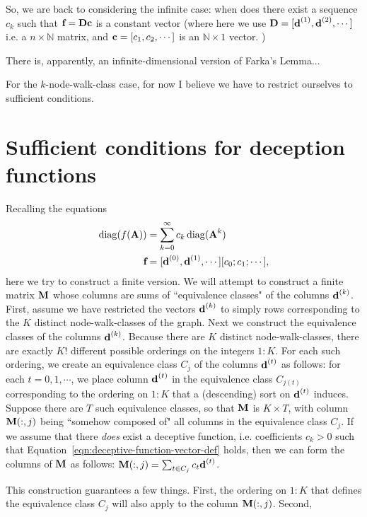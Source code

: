 So, we are back to considering the infinite case: when does there exist a sequence $c_k$ such that $\textbf{f} = \textbf{D} \textbf{c}$ is a constant vector (where here we use $\textbf{D} = [ \textbf{d}^{(1)}, \textbf{d}^{(2)}, \cdots ]$ i.e. a $n\times \mathbb{N}$ matrix, and $\textbf{c} = [ c_1, c_2, \cdots ]$ is an $\mathbb{N}\times 1$ vector. )

There is, apparently, an infinite-dimensional version of Farka's Lemma...


For the $k$-node-walk-class case, for now I believe we have to restrict ourselves to sufficient conditions.


\section{Sufficient conditions for deception functions}

Recalling the equations
\begin{align}
  \operatorname{diag}(f(\textbf{A})) &= \sum_{k=0}^{\infty} c_k \operatorname{diag}(\textbf{A}^k) \\
  \textbf{f} &= [ \textbf{d}^{(0)}, \textbf{d}^{(1)}, \cdots ] [ c_0; c_1; \cdots ] , \label{eqn:deceptive-function-vector-def}
\end{align}
 here we try to construct a finite version.
We will attempt to construct a finite matrix $\textbf{M}$ whose columns are sums of ``equivalence classes" of the columns $\textbf{d}^{(k)}$.
First, assume we have restricted the vectors $\textbf{d}^{(k)}$ to simply rows corresponding to the $K$ distinct node-walk-classes of the graph.
Next we construct the equivalence classes of the columns $\textbf{d}^{(k)}$. Because there are $K$ distinct node-walk-classes, there are exactly $K!$ different possible orderings on the integers $1:K$. For each such ordering, we create an equivalence class $C_j$ of the columns $\textbf{d}^{(t)}$ as follows: for each $t = 0,1,\cdots$, we place column $\textbf{d}^{(t)}$ in the equivalence class $C_{j(t)}$ corresponding to the ordering on $1:K$ that a (descending) sort on $\textbf{d}^{(t)}$ induces. Suppose there are $T$ such equivalence classes, so that $\textbf{M}$ is $K \times T$,
with column $\textbf{M}(:,j)$ being ``somehow composed of" all columns in the equivalence class $C_j$.
If we assume that there \emph{does} exist a deceptive function, i.e. coefficients $c_k >0$ such that Equation~\eqref{eqn:deceptive-function-vector-def} holds, then we can form the columns of $\textbf{M}$ as follows: $\textbf{M}(:,j) = \sum_{t \in C_j}  c_t \textbf{d}^{(t)}$.

This construction guarantees a few things. First, the ordering on $1:K$ that defines the equivalence class $C_j$ will also apply to the column $\textbf{M}(:,j)$. Second,

